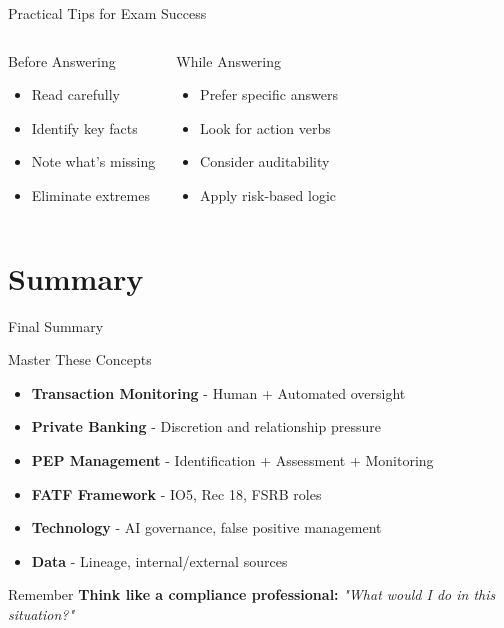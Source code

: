 \documentclass{beamer}
\begin{document}
\begin{frame}{Practical Tips for Exam Success}
\begin{columns}
\begin{block}{Before Answering}
\begin{itemize}
    \item Read carefully
    \item Identify key facts
    \item Note what's missing
    \item Eliminate extremes
\end{itemize}
\end{block}

\begin{block}{While Answering}
\begin{itemize}
    \item Prefer specific answers
    \item Look for action verbs
    \item Consider auditability
    \item Apply risk-based logic
\end{itemize}
\end{block}
\end{columns}
\end{frame}

\section{Summary}
\begin{frame}{Final Summary}
\begin{block}{Master These Concepts}
\begin{itemize}
    \item \textbf{Transaction Monitoring} - Human + Automated oversight
    \item \textbf{Private Banking} - Discretion and relationship pressure
    \item \textbf{PEP Management} - Identification + Assessment + Monitoring
    \item \textbf{FATF Framework} - IO5, Rec 18, FSRB roles
    \item \textbf{Technology} - AI governance, false positive management
    \item \textbf{Data} - Lineage, internal/external sources
\end{itemize}
\end{block}

\begin{alertblock}{Remember}
\textbf{Think like a compliance professional:}
\textit{"What would I do in this situation?"}
\end{alertblock}
\end{frame}
\end{document}
